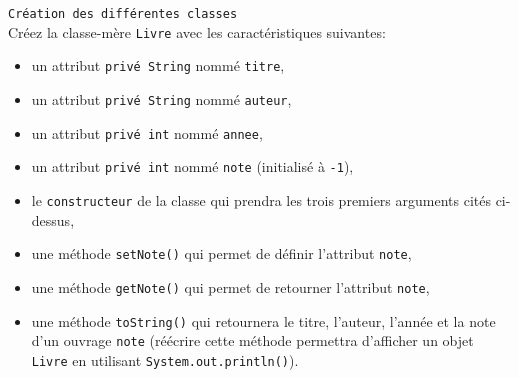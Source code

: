 \begin{Exercice}[20 minutes] \lstinline{Création des différentes classes}\\
Créez la classe-mère \lstinline{Livre} avec les caractéristiques suivantes:
\begin{itemize}
	\item un attribut \lstinline{privé String} nommé \lstinline{titre},
	\item un attribut \lstinline{privé String} nommé \lstinline{auteur},
	\item un attribut \lstinline{privé int} nommé \lstinline{annee},
	\item un attribut \lstinline{privé int} nommé \lstinline{note} (initialisé à \lstinline{-1}),
	\item le \lstinline{constructeur} de la classe qui prendra les trois premiers arguments cités ci-dessus,
	\item une méthode \lstinline{setNote()} qui permet de définir l'attribut \lstinline{note},
	\item une méthode \lstinline{getNote()} qui permet de retourner l'attribut \lstinline{note},
	\item une méthode \lstinline{toString()} qui retournera le titre, l'auteur, l'année et la note d'un ouvrage \lstinline{note} (réécrire cette méthode permettra d'afficher un objet \lstinline{Livre} en utilisant \lstinline{System.out.println()}). \\
\end{itemize}


\end{Exercice}
